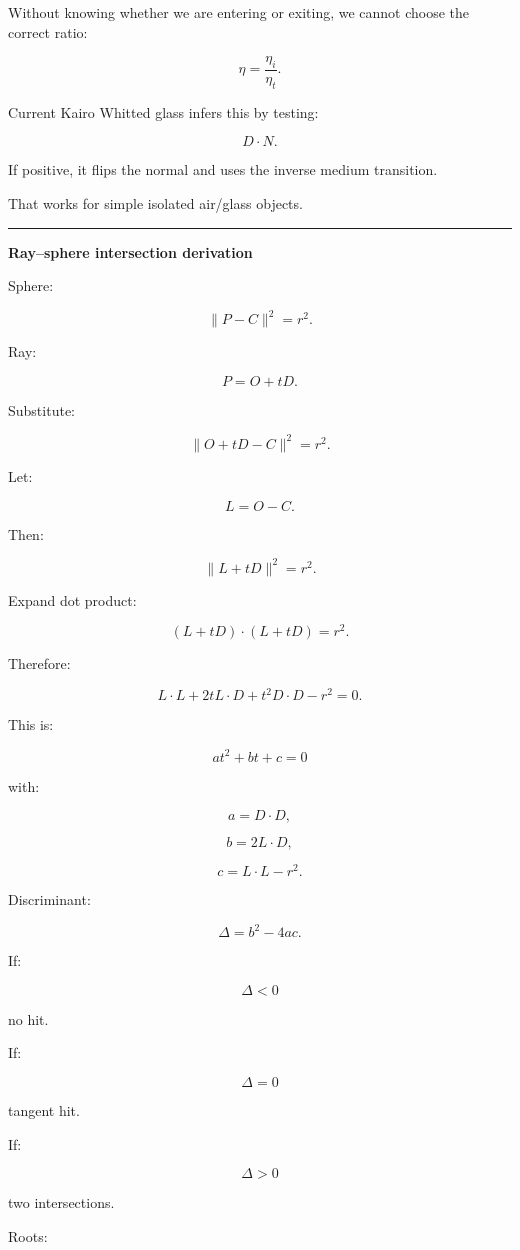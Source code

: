 Without knowing whether we are entering or exiting, we cannot choose the correct ratio:

\[
\eta=
\frac{\eta_i}{\eta_t}.
\]

Current Kairo Whitted glass infers this by testing:

\[
D\cdot N.
\]

If positive, it flips the normal and uses the inverse medium transition.

That works for simple isolated air/glass objects.

\begin{center}\rule{0.5\linewidth}{0.5pt}\end{center}

\textbf{Ray--sphere intersection derivation}

Sphere:

\[
\|P-C\|^2=r^2.
\]

Ray:

\[
P=O+tD.
\]

Substitute:

\[
\|O+tD-C\|^2=r^2.
\]

Let:

\[
L=O-C.
\]

Then:

\[
\|L+tD\|^2=r^2.
\]

Expand dot product:

\[
(L+tD)\cdot(L+tD)=r^2.
\]

Therefore:

\[
L\cdot L
+
2tL\cdot D
+
t^2D\cdot D
-
r^2
=
0.
\]

This is:

\[
\boxed{
at^2+bt+c=0
}
\]

with:

\[
a=D\cdot D,
\]

\[
b=2L\cdot D,
\]

\[
c=L\cdot L-r^2.
\]

Discriminant:

\[
\Delta=b^2-4ac.
\]

If:

\[
\Delta<0
\]

no hit.

If:

\[
\Delta=0
\]

tangent hit.

If:

\[
\Delta>0
\]

two intersections.

Roots:

